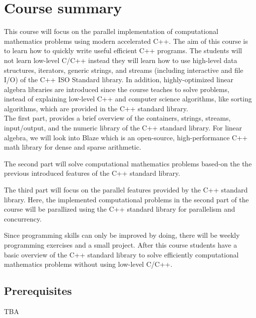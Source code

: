 \documentclass[11pt,letterpaper]{article}
\begin{document}
\section*{Course summary}
This course will focus on the parallel implementation of computational mathematics problems using modern accelerated C++. The aim of this course is to learn how to quickly write useful efficient C++ programs. The students will not learn low-level C/C++ instead they will learn how to use high-level data structures, iterators, generic strings, and streams (including interactive and file I/O) of the C++ ISO Standard library. In addition, highly-optimized linear algebra libraries are introduced since the course teaches to solve problems, instead of explaining low-level C++ and computer science algorithms, like sorting algorithms, which are provided in the C++ standard library.\\

\noindent
The first part, provides a brief overview of the containers, strings, streams, input/output, and the numeric library of the C++ standard library. For linear algebra, we will look into Blaze which is an open-source, high-performance C++ math library for dense and sparse arithmetic.

The second part will solve computational mathematics problems based-on the the previous introduced features of the C++ standard library.

The third part will focus on the parallel features provided by the C++ standard library. Here, the implemented computational problems in the second part of the course will be parallized using the C++ standard library for parallelism and concurrency.

Since programming skills can only be improved by doing, there will be weekly programming exercises and a small project. After this course students have a basic overview of the C++ standard library to solve efficiently computational mathematics problems without using low-level C/C++.
\subsection*{Prerequisites}
TBA

\end{document}
